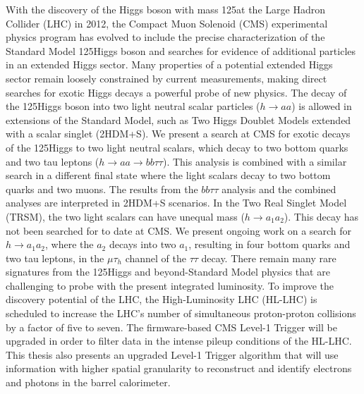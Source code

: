 With the discovery of the Higgs boson with mass 125\GeV at the Large Hadron Collider (LHC) in 2012, the Compact Muon Solenoid (CMS) experimental physics program has evolved to include the precise characterization of the Standard Model 125\GeV Higgs boson and searches for evidence of additional particles in an extended Higgs sector. Many properties of a potential extended Higgs sector remain loosely constrained by current measurements, making direct searches for exotic Higgs decays a powerful probe of new physics. The decay of the 125\GeV Higgs boson into two light neutral scalar particles ($h\rightarrow aa$) is allowed in extensions of the Standard Model, such as Two Higgs Doublet Models extended with a scalar singlet (2HDM+S). We present a search at CMS for exotic decays of the 125\GeV Higgs to two light neutral scalars, which decay to two bottom quarks and two tau leptons ($h\rightarrow aa \rightarrow bb\tau\tau$). This analysis is combined with a similar search in a different final state where the light scalars decay to two bottom quarks and two muons. The results from the $bb\tau\tau$ analysis and the combined analyses are interpreted in 2HDM+S scenarios. In the Two Real Singlet Model (TRSM), the two light scalars can have unequal mass ($h\rightarrow a_1 a_2$). This decay has not been searched for to date at CMS. We present ongoing work on a search for $h\rightarrow a_1 a_2$, where the $a_2$ decays into two $a_1$, resulting in four bottom quarks and two tau leptons, in the $\mu\tau_{h}$ channel of the $\tau\tau$ decay. There remain many rare signatures from the 125\GeV Higgs and beyond-Standard Model physics that are challenging to probe with the present integrated luminosity. To improve the discovery potential of the LHC, the High-Luminosity LHC (HL-LHC) is scheduled to increase the LHC's number of simultaneous proton-proton collisions by a factor of five to seven. The firmware-based CMS Level-1 Trigger will be upgraded in order to filter data in the intense pileup conditions of the HL-LHC. This thesis also presents an upgraded Level-1 Trigger algorithm that will use information with higher spatial granularity to reconstruct and identify electrons and photons in the barrel calorimeter.
